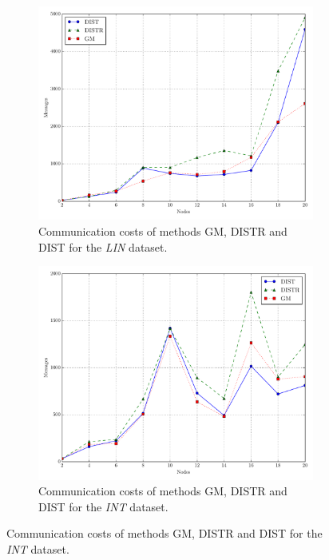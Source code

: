\begin{figure}[H]
\begin{subfigure}{0.32\textwidth}
  \includegraphics[width=\linewidth]{img/matching_msg_linear.pdf}
  \caption{Communication costs of methods GM, DISTR and DIST for the \emph{LIN} dataset.}
\end{subfigure}\hfill
\begin{subfigure}{0.32\textwidth}
  \includegraphics[width=\linewidth]{img/matching_msg_interweaving.pdf}
  \caption{Communication costs of methods GM, DISTR and DIST for the \emph{INT} dataset.}
\end{subfigure}\hfill

\end{figure}
